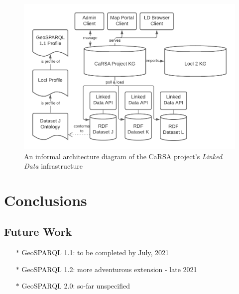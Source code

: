 \documentclass[runningheads]{llncs}
\begin{document}
\begin{figure}[htb]
    \centering
    \includegraphics[width=\linewidth]{images/carsa-arch.png}
    \caption{An informal architecture diagram of the CaRSA project's \textit{Linked Data} infrastructure}
    \label{fig:geosparql11ontology}
\end{figure}


\section{Conclusions}\label{sec:conclusions}




\subsection{Future Work}\label{sec:futurework}
\begin{itemize}
    \item[$\ast$] GeoSPARQL 1.1: to be completed by July, 2021
    \item[$\ast$] GeoSPARQL 1.2: more adventurous extension - late 2021
    \item[$\ast$] GeoSPARQL 2.0: so-far unspecified
\end{itemize}


%
%
%


%




\end{document}
